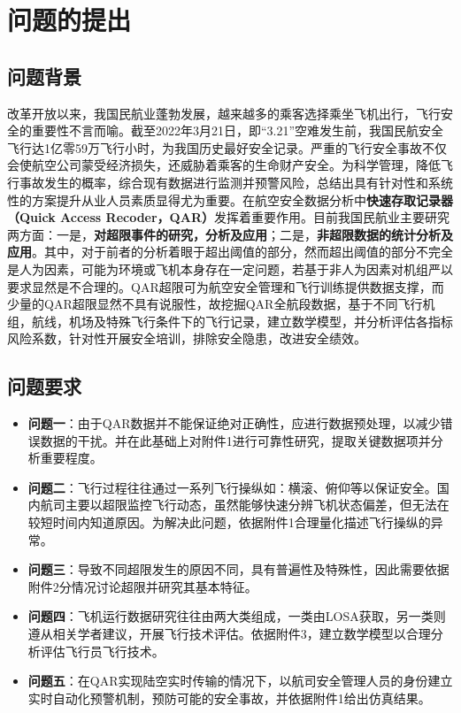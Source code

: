 \documentclass{MathorCupModeling}
\begin{document}
	\pagestyle{empty}
	\tableofcontents
	\newpage
	\pagestyle{fancy}

	\setcounter{page}{1}
	\section{问题的提出}
	\subsection{问题背景}
	改革开放以来，我国民航业蓬勃发展，越来越多的乘客选择乘坐飞机出行，飞行安全的重要性不言而喻。截至2022年3月21日，即“3.21”空难发生前，我国民航安全飞行达1亿零59万飞行小时，为我国历史最好安全记录。严重的飞行安全事故不仅会使航空公司蒙受经济损失，还威胁着乘客的生命财产安全。为科学管理，降低飞行事故发生的概率，综合现有数据进行监测并预警风险，总结出具有针对性和系统性的方案提升从业人员素质显得尤为重要。在航空安全数据分析中\textbf{快速存取记录器（Quick Access Recoder，QAR）}发挥着重要作用。目前我国民航业主要研究两方面：{\heiti 一是}，\textbf{对超限事件的研究，分析及应用}；{\heiti 二是}，\textbf{非超限数据的统计分析及应用}。其中，对于前者的分析着眼于超出阈值的部分，然而超出阈值的部分不完全是人为因素，可能为环境或飞机本身存在一定问题，若基于非人为因素对机组严以要求显然是不合理的。QAR超限可为航空安全管理和飞行训练提供数据支撑，而少量的QAR超限显然不具有说服性，故挖掘QAR全航段数据，基于不同飞行机组，航线，机场及特殊飞行条件下的飞行记录，建立数学模型，并分析评估各指标风险系数，针对性开展安全培训，排除安全隐患，改进安全绩效。
	\subsection{问题要求}
	\begin{itemize}
		\item \textbf{问题一}：由于QAR数据并不能保证绝对正确性，应进行数据预处理，以减少错误数据的干扰。并在此基础上对附件1进行可靠性研究，提取关键数据项并分析重要程度。
		\item \textbf{问题二}：飞行过程往往通过一系列飞行操纵如：横滚、俯仰等以保证安全。国内航司主要以超限监控飞行动态，虽然能够快速分辨飞机状态偏差，但无法在较短时间内知道原因。为解决此问题，依据附件1合理量化描述飞行操纵的异常。
		\item \textbf{问题三}：导致不同超限发生的原因不同，具有普遍性及特殊性，因此需要依据附件2分情况讨论超限并研究其基本特征。
		\item \textbf{问题四}：飞机运行数据研究往往由两大类组成，一类由LOSA获取，另一类则遵从相关学者建议，开展飞行技术评估。依据附件3，建立数学模型以合理分析评估飞行员飞行技术。
		\item \textbf{问题五}：在QAR实现陆空实时传输的情况下，以航司安全管理人员的身份建立实时自动化预警机制，预防可能的安全事故，并依据附件1给出仿真结果。
	\end{itemize}
\end{document}
